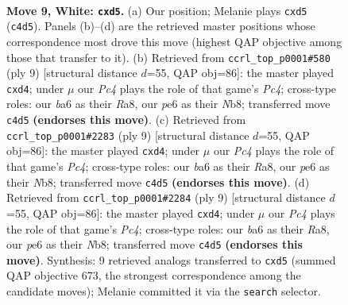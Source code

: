 \documentclass[11pt]{article}
\begin{document}
\clearpage

\begin{figure}[p]\centering
\begin{subfigure}{0.46\textwidth}\centering
\resizebox{\linewidth}{!}{%
\newchessgame
\chessboard[
  setfen={rn1qk2r/p1p1bpp1/bp2pn2/3p3p/2PP4/1P4P1/P2BPPBP/RN1QK1NR w KQkq - 0 9},
  showmover=false,
  pgfstyle=straightmove, color=movearrow, markmove={c4-d5}
]}
\caption{}
\end{subfigure}\hfill
\begin{subfigure}{0.46\textwidth}\centering
\resizebox{\linewidth}{!}{%
\newchessgame
\chessboard[
  setfen={rnbqk1nr/pp2ppbp/3p2p1/2p5/2BPP3/2P2N2/PP3PPP/RNBQK2R b KQkq - 0 5},
  showmover=false,
  pgfstyle=straightmove, color=movearrow, markmove={c5-d4}
]}
\caption{}
\end{subfigure}
\\[4pt]
\begin{subfigure}{0.46\textwidth}\centering
\resizebox{\linewidth}{!}{%
\newchessgame
\chessboard[
  setfen={rnbqk1nr/pp2ppbp/3p2p1/2p5/2BPP3/2P2N2/PP3PPP/RNBQK2R b KQkq - 0 5},
  showmover=false,
  pgfstyle=straightmove, color=movearrow, markmove={c5-d4}
]}
\caption{}
\end{subfigure}\hfill
\begin{subfigure}{0.46\textwidth}\centering
\resizebox{\linewidth}{!}{%
\newchessgame
\chessboard[
  setfen={rnbqk1nr/pp2ppbp/3p2p1/2p5/2BPP3/2P2N2/PP3PPP/RNBQK2R b KQkq - 0 5},
  showmover=false,
  pgfstyle=straightmove, color=movearrow, markmove={c5-d4}
]}
\caption{}
\end{subfigure}
\caption{\textbf{Move 9, White: \texttt{cxd5}.} (a) Our position; Melanie plays \texttt{cxd5} (\texttt{c4d5}). Panels (b)--(d) are the retrieved master positions whose correspondence most drove this move (highest QAP objective among those that transfer to it). (b) Retrieved from \texttt{ccrl\_top\_p0001\#580} (ply 9) [structural distance $d$=55, QAP obj=86]: the master played \texttt{cxd4}; under $\mu$ our \emph{Pc4} plays the role of that game's \emph{Pc4}; cross-type roles: our \emph{b}a6 as their \emph{R}a8, our \emph{p}e6 as their \emph{N}b8; transferred move \texttt{c4d5} \textbf{(endorses this move)}. (c) Retrieved from \texttt{ccrl\_top\_p0001\#2283} (ply 9) [structural distance $d$=55, QAP obj=86]: the master played \texttt{cxd4}; under $\mu$ our \emph{Pc4} plays the role of that game's \emph{Pc4}; cross-type roles: our \emph{b}a6 as their \emph{R}a8, our \emph{p}e6 as their \emph{N}b8; transferred move \texttt{c4d5} \textbf{(endorses this move)}. (d) Retrieved from \texttt{ccrl\_top\_p0001\#2284} (ply 9) [structural distance $d$=55, QAP obj=86]: the master played \texttt{cxd4}; under $\mu$ our \emph{Pc4} plays the role of that game's \emph{Pc4}; cross-type roles: our \emph{b}a6 as their \emph{R}a8, our \emph{p}e6 as their \emph{N}b8; transferred move \texttt{c4d5} \textbf{(endorses this move)}. Synthesis: 9 retrieved analogs transferred to \texttt{cxd5} (summed QAP objective 673, the strongest correspondence among the candidate moves); Melanie committed it via the \texttt{search} selector.}
\label{fig:thought-m16}
\end{figure}
\end{document}
